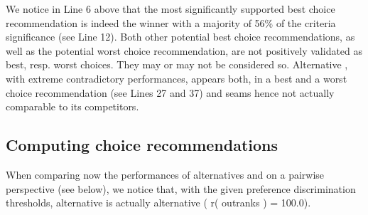 \documentclass[a4paper,10pt,english]{sphinxhowto}
\begin{document}
We notice in Line 6 above that the most significantly supported best
choice recommendation is indeed the  winner  with a
majority of 56\% of the criteria significance (see Line 12). Both other
potential best choice recommendations, as well as the potential worst
choice recommendation, are not positively validated as best,
resp. worst choices. They may or may not be considered so. Alternative , with extreme contradictory performances, appears both, in a best and a worst choice recommendation (see Lines 27 and 37) and seams hence not actually comparable to its competitors.


\subsection{Computing  choice recommendations}
\label{\detokenize{tutorial:computing-strict-best-choice-recommendations}}
When comparing now the performances of alternatives  and  on a
pairwise perspective (see below), we notice that, with the given preference discrimination thresholds, alternative  is actually   alternative  ( r( outranks ) = 100.0).

\begin{sphinxVerbatim}[commandchars=\\\{\},numbers=left,firstnumber=1,stepnumber=1]
\end{sphinxVerbatim}
\end{document}

